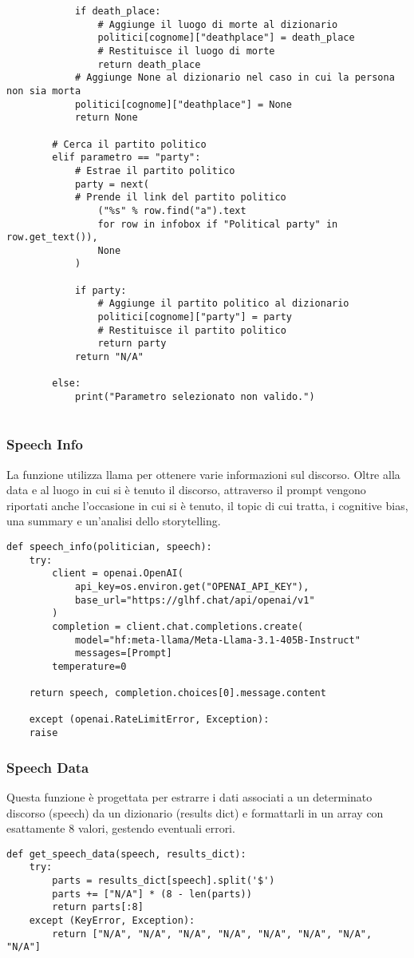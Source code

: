 \documentclass[12pt]{article}
\begin{document}
\begin{lstlisting}
			if death_place:
				# Aggiunge il luogo di morte al dizionario
				politici[cognome]["deathplace"] = death_place
				# Restituisce il luogo di morte
				return death_place
			# Aggiunge None al dizionario nel caso in cui la persona non sia morta
			politici[cognome]["deathplace"] = None
			return None

		# Cerca il partito politico
		elif parametro == "party":
			# Estrae il partito politico
			party = next(
			# Prende il link del partito politico
				("%s" % row.find("a").text
				for row in infobox if "Political party" in row.get_text()), 
				None
			)

			if party:
				# Aggiunge il partito politico al dizionario
				politici[cognome]["party"] = party
				# Restituisce il partito politico
				return party
			return "N/A"

		else:
			print("Parametro selezionato non valido.")
	
		\end{lstlisting}

		\subsubsection{Speech Info}
La funzione utilizza llama per ottenere varie informazioni sul discorso. Oltre alla data e al luogo in cui si è tenuto il discorso, attraverso il prompt vengono riportati anche l'occasione in cui si è tenuto, il topic di cui tratta, i cognitive bias, una summary e un'analisi dello storytelling.
		\begin{lstlisting}
def speech_info(politician, speech):
	try:
		client = openai.OpenAI(
			api_key=os.environ.get("OPENAI_API_KEY"),
			base_url="https://glhf.chat/api/openai/v1"
		)
		completion = client.chat.completions.create(
			model="hf:meta-llama/Meta-Llama-3.1-405B-Instruct"
			messages=[Prompt]
		temperature=0
		
	return speech, completion.choices[0].message.content
	
	except (openai.RateLimitError, Exception):
	raise
		\end{lstlisting}
\newpage		
		\subsubsection{Speech Data}
		Questa funzione è progettata per estrarre i dati associati a un determinato discorso (speech) da un dizionario (results dict) e formattarli in un array con esattamente 8 valori, gestendo eventuali errori.
		\begin{lstlisting}
def get_speech_data(speech, results_dict):
	try:
		parts = results_dict[speech].split('$')
		parts += ["N/A"] * (8 - len(parts))
		return parts[:8]
	except (KeyError, Exception):
		return ["N/A", "N/A", "N/A", "N/A", "N/A", "N/A", "N/A", "N/A"]

		\end{lstlisting}
		
\end{document}
